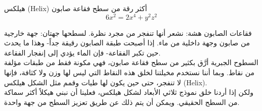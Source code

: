 \begin{surferPage}[هيلكس]{هيلكس (Helix)}
أكثر رقة من سطح فقاعة صابون\\
  \smallskip
\[6x^2	= 2x^4	+ y^2	z^2\]

\singlespacing
فقاعات الصابون هشة: نشعر أنها تنفجر من مجرد نظرة. لسطحها جهتان: جهة خارجية من صابون وجهة داخلية من ماء. إذا أصبحت طبقة الصابون رقيقة جداً- وهذا ما يحدث حين تكبر الفقاعة- فإن الماء يؤدي إلى إنفجار الفقاعة.\\
\vspace{0,3cm}
السطوح الجبرية أرَّق بكثير من سطح فقاعة صابون، فهي مكونة فقط من طبقات مؤلفة من نقاط. وبما أننا نستخدم مخيلتنا لخلق هذه النقاط التي ليس لها وزن ولا كثافة، فإنها لا تنفجر، حتى حين يكون لها طيات وقمم مثل الشكل هيلكس \textenglish{(Helix)}.\\
\vspace{0,3cm}
ولكن إذا أردنا خلق نموذج ثلاثي الأبعاد لشكل هيلكس، فعلينا أن نبني هيكلاً أكثر سماكة من السطح الحقيقي. ويمكن أن يتم ذلك عن طريق تعزيز السطح من جهة واحدة.
\end{surferPage}
